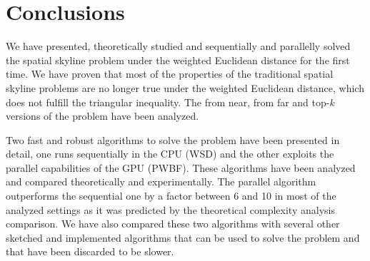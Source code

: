 \documentclass[11pt,onecolumn]{elsart3p}
\begin{document}
%





\section{Conclusions} \label{sec:Conclusions}

We have presented, theoretically studied and sequentially and parallelly solved the spatial skyline problem under the weighted Euclidean distance for the first time. We have proven that most of the properties of the traditional spatial skyline problems are no longer true under the weighted Euclidean distance, which does not fulfill the triangular inequality. The from near, from far and top-$k$ versions of the problem have been analyzed.

Two fast and robust algorithms to solve the problem have been presented in detail, one runs sequentially in the CPU (WSD) and the other exploits the parallel capabilities of the GPU (PWBF). These algorithms have been analyzed and compared theoretically and experimentally. The parallel algorithm outperforms the sequential one by a factor between 6 and 10 in most of the analyzed settings as it was predicted by the theoretical complexity analysis comparison. We have also compared these two algorithms with several other sketched and implemented algorithms that can be used to solve the problem and that have been discarded to be slower.
\end{document}
